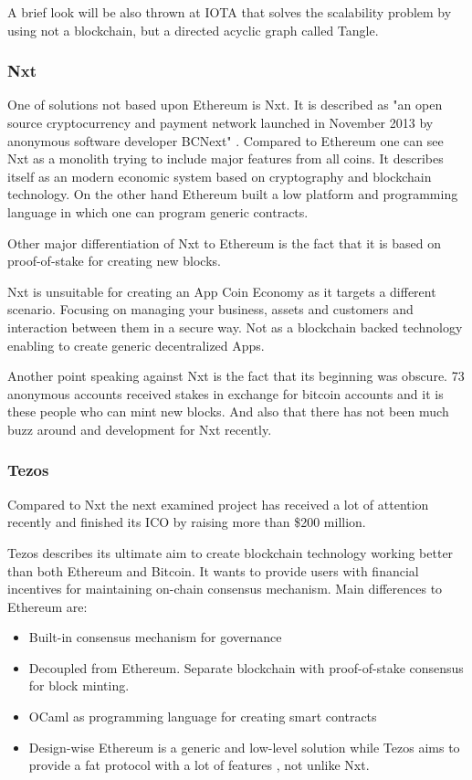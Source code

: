 A brief look will be also thrown at IOTA that solves the scalability problem by using not a blockchain, but a directed acyclic graph called Tangle.

\subsubsection{Nxt}
One of solutions not based upon Ethereum is Nxt. It is described as "an open source cryptocurrency and payment network launched in November 2013 by anonymous software developer BCNext" \cite{Nxt}. Compared to Ethereum one can see Nxt as a monolith trying to include major features from all coins. It describes itself as an modern economic system based on cryptography and blockchain technology. On the other hand Ethereum built a low platform and programming language in which one can program generic contracts.

Other major differentiation of Nxt to Ethereum is the fact that it is based on proof-of-stake for creating new blocks.

Nxt is unsuitable for creating an App Coin Economy as it targets a different scenario. Focusing on managing your business, assets and customers and interaction between them in a secure way. Not as a blockchain backed technology enabling to create generic decentralized Apps.

Another point speaking against Nxt is the fact that its beginning was obscure. 73 anonymous accounts received stakes in exchange for bitcoin accounts and it is these people who can mint new blocks. And also that there has not been much buzz around and development for Nxt recently.

\subsubsection{Tezos}
Compared to Nxt the next examined project has received a lot of attention recently and finished its ICO by raising more than \$200 million.

Tezos describes its ultimate aim to create blockchain technology working better than both Ethereum and Bitcoin. It wants to provide users with financial incentives for maintaining on-chain consensus mechanism. Main differences to Ethereum are:

\begin{itemize}
    \item Built-in consensus mechanism for governance
    \item Decoupled from Ethereum. Separate blockchain with proof-of-stake consensus for block minting.
    \item OCaml as programming language for creating smart contracts
    \item Design-wise Ethereum is a generic and low-level solution while Tezos aims to provide a fat protocol with a lot of features \cite{TezosEth}, not unlike Nxt.
\end{itemize}

